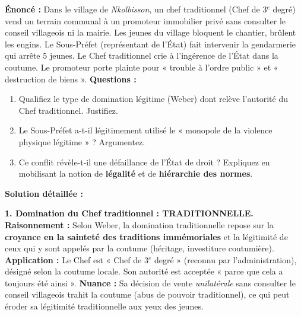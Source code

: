 \documentclass[11pt]{article}
\begin{document}
\begin{exoresolu}
\textbf{Énoncé :} Dans le village de \emph{Nkolbisson}, un chef traditionnel (Chef de 3$^e$ degré) vend un terrain communal à un promoteur immobilier privé sans consulter le conseil villageois ni la mairie. Les jeunes du village bloquent le chantier, brûlent les engins. Le Sous-Préfet (représentant de l'État) fait intervenir la gendarmerie qui arrête 5 jeunes. Le Chef traditionnel crie à l'ingérence de l'État dans la coutume. Le promoteur porte plainte pour « trouble à l'ordre public » et « destruction de biens ».
\textbf{Questions :}
\begin{enumerate}
    \item Qualifiez le type de domination légitime (Weber) dont relève l'autorité du Chef traditionnel. Justifiez.
    \item Le Sous-Préfet a-t-il légitimement utilisé le « monopole de la violence physique légitime » ? Argumentez.
    \item Ce conflit révèle-t-il une défaillance de l'État de droit ? Expliquez en mobilisant la notion de \textbf{légalité} et de \textbf{hiérarchie des normes}.
\end{enumerate}
\tcblower
\textbf{Solution détaillée :}

\textbf{1. Domination du Chef traditionnel : TRADITIONNELLE.}
\textbf{Raisonnement :} Selon Weber, la domination traditionnelle repose sur la \textbf{croyance en la sainteté des traditions immémoriales} et la légitimité de ceux qui y sont appelés par la coutume (héritage, investiture coutumière).
\textbf{Application :} Le Chef est « Chef de 3$^e$ degré » (reconnu par l'administration), désigné selon la coutume locale. Son autorité est acceptée « parce que cela a toujours été ainsi ». \textbf{Nuance :} Sa décision de vente \emph{unilatérale} sans consulter le conseil villageois trahit la coutume (abus de pouvoir traditionnel), ce qui peut éroder sa légitimité traditionnelle aux yeux des jeunes.


\end{exoresolu}
\end{document}
